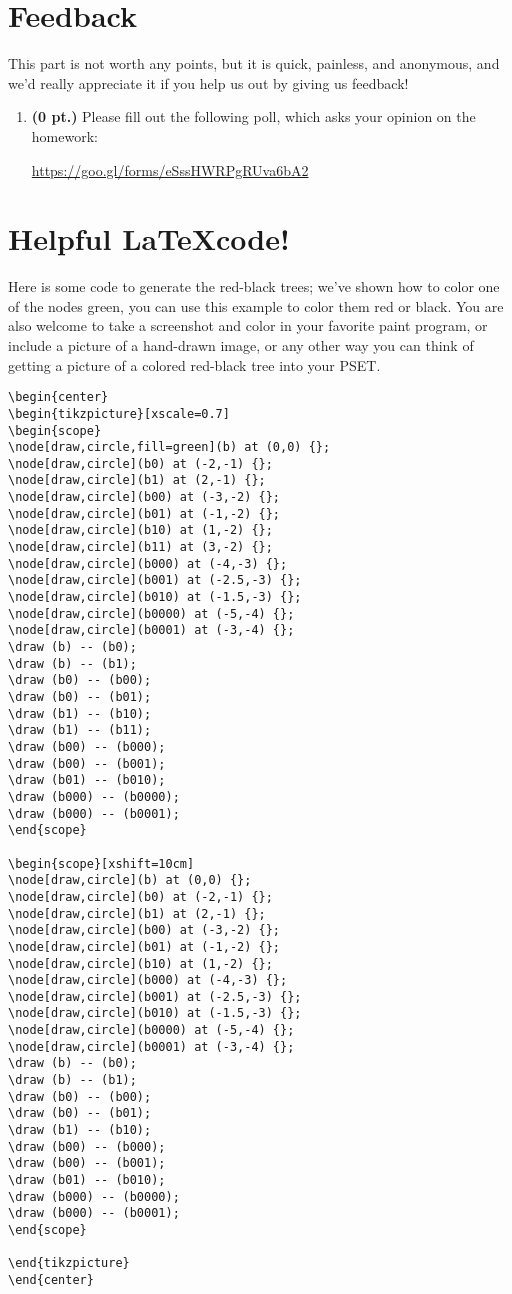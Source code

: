 \documentclass{article}
\newcommand{\pts}[1]{\textbf{(#1 pt.)}}
\begin{document}
\section*{Feedback}
This part is not worth any points, but it is quick, painless, and anonymous, and we'd really appreciate it if you help us out by giving us feedback!

\begin{enumerate}
\item \pts{0} Please fill out the following poll, which asks your opinion on the homework:
\begin{center}
\url{https://goo.gl/forms/eSssHWRPgRUva6bA2}
\end{center}
\end{enumerate}
\newpage
\section*{Helpful \LaTeX code!}
Here is some code to generate the red-black trees; we've shown how to color one of the nodes green, you can use this example to color them red or black.  You are also welcome to take a screenshot and color in your favorite paint program, or include a picture of a hand-drawn image, or any other way you can think of getting a picture of a colored red-black tree into your PSET.
\footnotesize
\begin{verbatim}
\begin{center}
\begin{tikzpicture}[xscale=0.7]
\begin{scope}
\node[draw,circle,fill=green](b) at (0,0) {};
\node[draw,circle](b0) at (-2,-1) {};
\node[draw,circle](b1) at (2,-1) {};
\node[draw,circle](b00) at (-3,-2) {};
\node[draw,circle](b01) at (-1,-2) {};
\node[draw,circle](b10) at (1,-2) {};
\node[draw,circle](b11) at (3,-2) {};
\node[draw,circle](b000) at (-4,-3) {};
\node[draw,circle](b001) at (-2.5,-3) {};
\node[draw,circle](b010) at (-1.5,-3) {};
\node[draw,circle](b0000) at (-5,-4) {};
\node[draw,circle](b0001) at (-3,-4) {};
\draw (b) -- (b0);
\draw (b) -- (b1);
\draw (b0) -- (b00);
\draw (b0) -- (b01);
\draw (b1) -- (b10);
\draw (b1) -- (b11);
\draw (b00) -- (b000);
\draw (b00) -- (b001);
\draw (b01) -- (b010);
\draw (b000) -- (b0000);
\draw (b000) -- (b0001);
\end{scope}

\begin{scope}[xshift=10cm]
\node[draw,circle](b) at (0,0) {};
\node[draw,circle](b0) at (-2,-1) {};
\node[draw,circle](b1) at (2,-1) {};
\node[draw,circle](b00) at (-3,-2) {};
\node[draw,circle](b01) at (-1,-2) {};
\node[draw,circle](b10) at (1,-2) {};
\node[draw,circle](b000) at (-4,-3) {};
\node[draw,circle](b001) at (-2.5,-3) {};
\node[draw,circle](b010) at (-1.5,-3) {};
\node[draw,circle](b0000) at (-5,-4) {};
\node[draw,circle](b0001) at (-3,-4) {};
\draw (b) -- (b0);
\draw (b) -- (b1);
\draw (b0) -- (b00);
\draw (b0) -- (b01);
\draw (b1) -- (b10);
\draw (b00) -- (b000);
\draw (b00) -- (b001);
\draw (b01) -- (b010);
\draw (b000) -- (b0000);
\draw (b000) -- (b0001);
\end{scope}

\end{tikzpicture}
\end{center}
\end{verbatim}
\end{document}

